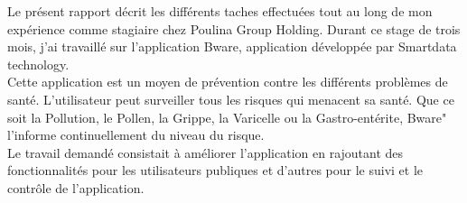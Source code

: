 \documentclass[11pt,fleqn]{book} %
\begin{document}
	Le présent rapport décrit les différents taches effectuées tout au long de mon expérience comme stagiaire chez Poulina Group Holding. Durant ce stage de trois mois, j'ai travaillé sur l'application Bware, application développée par Smartdata technology.\\
	Cette application est un moyen de prévention contre les différents problèmes de santé. L'utilisateur peut surveiller tous les risques qui menacent sa santé. Que ce soit la Pollution, le Pollen, la Grippe, la Varicelle ou la Gastro-entérite, Bware" l'informe continuellement du niveau du risque.\\
	
	Le travail demandé consistait à améliorer l'application en rajoutant des fonctionnalités pour les utilisateurs publiques et d'autres pour le suivi et le contrôle de l'application.

		
	
	\newpage

	
	
	\renewcommand\contentsname{Table des Matières}
	\tableofcontents
	
	
	
	
\end{document}
